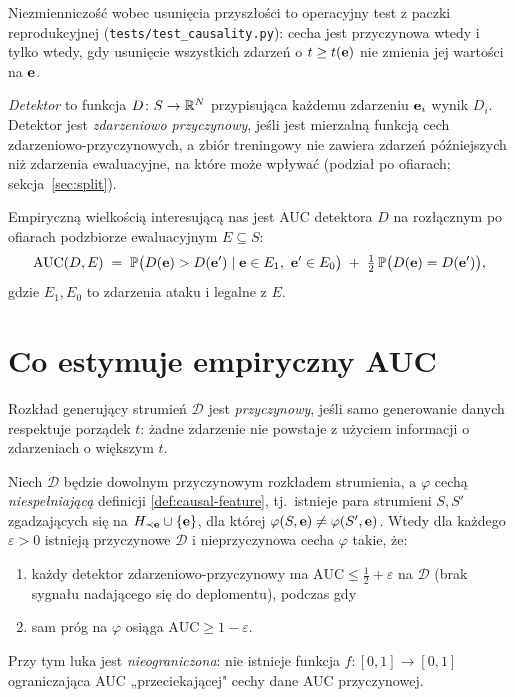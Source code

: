 Niezmienniczość wobec usunięcia przyszłości to operacyjny test z paczki
reprodukcyjnej (\texttt{tests/test\_causality.py}): cecha jest
przyczynowa wtedy i tylko wtedy, gdy usunięcie wszystkich zdarzeń o
$t\ge t(\mathbf{e})$ nie zmienia jej wartości na $\mathbf{e}$.

\begin{definition}
\label{def:causal-detector}
\emph{Detektor} to funkcja $D\colon S\to\mathbb{R}^N$ przypisująca każdemu
zdarzeniu $\mathbf{e}_i$ wynik $D_i$. Detektor jest \emph{zdarzeniowo
przyczynowy}, jeśli jest mierzalną funkcją cech
zdarzeniowo-przyczynowych, a zbiór treningowy nie zawiera zdarzeń
późniejszych niż zdarzenia ewaluacyjne, na które może wpływać
(podział po ofiarach; sekcja~\ref{sec:split}).
\end{definition}

Empiryczną wielkością interesującą nas jest AUC detektora $D$ na
rozłącznym po ofiarach podzbiorze ewaluacyjnym $E\subseteq S$:
\[
\mathrm{AUC}(D,E) \;=\;
\mathbb{P}\big(D(\mathbf{e}) > D(\mathbf{e}') \mid \mathbf{e}\in E_1,\ \mathbf{e}'\in E_0\big)
\;+\;\tfrac12\,\mathbb{P}\big(D(\mathbf{e})=D(\mathbf{e}')\big),
\]
gdzie $E_1,E_0$ to zdarzenia ataku i legalne z $E$.

\chapter{Co estymuje empiryczny AUC}
\label{sec:what-estimates}

\begin{definition}
Rozkład generujący strumień $\mathcal{D}$ jest \emph{przyczynowy}, jeśli
samo generowanie danych respektuje porządek $t$: żadne zdarzenie nie
powstaje z użyciem informacji o zdarzeniach o większym $t$.
\end{definition}

\begin{theorem}
\label{thm:lookahead}
Niech $\mathcal{D}$ będzie dowolnym przyczynowym rozkładem strumienia,
a $\varphi$ cechą \emph{niespełniającą} definicji
\ref{def:causal-feature}, tj.\ istnieje para strumieni $S,S'$
zgadzających się na $H_{\prec\mathbf{e}}\cup\{\mathbf{e}\}$, dla której
$\varphi(S,\mathbf{e})\ne\varphi(S',\mathbf{e})$. Wtedy dla każdego
$\varepsilon>0$ istnieją przyczynowe $\mathcal{D}$ i nieprzyczynowa
cecha $\varphi$ takie, że:
\begin{enumerate}
\item[(a)] każdy detektor zdarzeniowo-przyczynowy ma
      $\mathrm{AUC}\le \tfrac12+\varepsilon$ na $\mathcal{D}$
      (brak sygnału nadającego się do deplomentu), podczas gdy
\item[(b)] sam próg na $\varphi$ osiąga $\mathrm{AUC}\ge 1-\varepsilon$.
\end{enumerate}
Przy tym luka jest \emph{nieograniczona}: nie istnieje funkcja
$f\colon[0,1]\to[0,1]$ ograniczająca AUC „przeciekającej" cechy dane AUC
przyczynowej.
\end{theorem}

